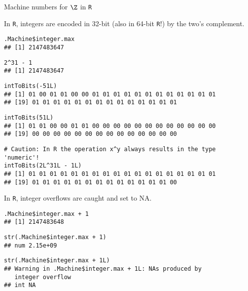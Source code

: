 \documentclass[11pt,compress,t,notes=noshow, xcolor=table]{beamer}
\begin{document}
\begin{vbframe}{Machine numbers for $\Z$ in \texttt{R}}

In \texttt{R}, integers are encoded in 32-bit (also in 64-bit \texttt{R}!) by the two's complement. 

\footnotesize
\vspace{0.5cm}
\begin{verbatim}
.Machine$integer.max
## [1] 2147483647
\end{verbatim}

\vspace{0.2cm}
\begin{verbatim}
2^31 - 1
## [1] 2147483647
\end{verbatim}


\framebreak 

\footnotesize
\vspace{0.5cm}
\begin{verbatim}
intToBits(-51L)
## [1] 01 00 01 01 00 00 01 01 01 01 01 01 01 01 01 01 01 01
## [19] 01 01 01 01 01 01 01 01 01 01 01 01 01 01
\end{verbatim}

\vspace{0.2cm}
\begin{verbatim}
intToBits(51L)
## [1] 01 01 00 00 01 01 00 00 00 00 00 00 00 00 00 00 00 00
## [19] 00 00 00 00 00 00 00 00 00 00 00 00 00 00
\end{verbatim}

\vspace{0.2cm}
\begin{verbatim}
# Caution: In R the operation x^y always results in the type 'numeric'!
intToBits(2L^31L - 1L)
## [1] 01 01 01 01 01 01 01 01 01 01 01 01 01 01 01 01 01 01
## [19] 01 01 01 01 01 01 01 01 01 01 01 01 01 00
\end{verbatim}



\framebreak 
\normalsize
In \texttt{R}, integer overflows are caught and set to NA.
\lz
\footnotesize
\begin{verbatim}
.Machine$integer.max + 1 
## [1] 2147483648
\end{verbatim}

\vspace{0.2cm}
\begin{verbatim}
str(.Machine$integer.max + 1) 
## num 2.15e+09
\end{verbatim}

\vspace{0.2cm}
\begin{verbatim}
str(.Machine$integer.max + 1L)
## Warning in .Machine$integer.max + 1L: NAs produced by 
   integer overflow
## int NA
\end{verbatim}


\end{vbframe}
\normalsize
\end{document}
